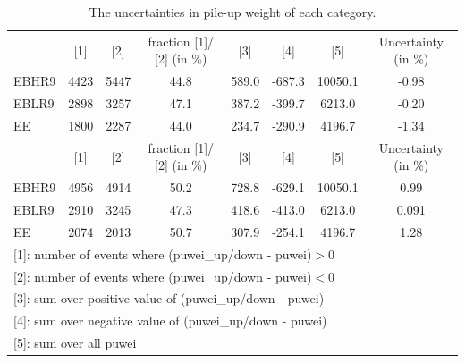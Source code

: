	\begin{table}[!ht]
	\scriptsize
	    \begin{center}
	    \begin{tabular}{lccccccc}
	    \hline
	    & \color{blue} [1] & \color{blue} [2] & fraction \color{blue} [1]/\color{blue} [2] \color{black} (in \%) & \color{blue} [3] & \color{blue} [4] & \color{blue} [5] & Uncertainty (in \%)\\
	    \cline{2-8}
	      EBHR9 & 4423 & 5447 & 44.8 & 589.0 & -687.3 & 10050.1 & -0.98 \\
	      EBLR9 & 2898 & 3257 & 47.1 & 387.2 & -399.7 & 6213.0 & -0.20 \\
	      EE & 1800 & 2287 & 44.0 & 234.7 & -290.9 & 4196.7 & -1.34\\
	      \hline
	      & \color{red} [1] & \color{red} [2] & fraction \color{red} [1]/\color{red} [2] \color{black} (in \%) & \color{red} [3] & \color{red} [4] & \color{red} [5] & Uncertainty (in \%) \\
	    \cline{2-8}
	      EBHR9 & 4956 & 4914 & 50.2 & 728.8 & -629.1 & 10050.1 & 0.99 \\
	      EBLR9 & 2910 & 3245 & 47.3 & 418.6 & -413.0 & 6213.0 & 0.091 \\
	      EE & 2074 & 2013 & 50.7 & 307.9 & -254.1 & 4196.7 & 1.28\\
	      \hline
	    \multicolumn{8}{l}{[1]: number of events where (puwei\_\color{blue}up\color{black}/\color{red}down \color{black} - puwei)$>0$} \\
	    \multicolumn{8}{l}{[2]: number of events where (puwei\_\color{blue}up\color{black}/\color{red}down \color{black} - puwei)$<0$}\\
	    \multicolumn{8}{l}{[3]: sum over positive value of (puwei\_\color{blue}up\color{black}/\color{red}down \color{black} - puwei)}\\
	    \multicolumn{8}{l}{[4]: sum over negative value of (puwei\_\color{blue}up\color{black}/\color{red}down \color{black} - puwei)}\\
	    \multicolumn{8}{l}{[5]: sum over all puwei}\\
	    \hline
	    \end{tabular}
	    \bigskip
	    \caption{The uncertainties in pile-up weight of each category. }
	    \label{tab:UnPUwei}
	    \end{center}
	\end{table} 
 
